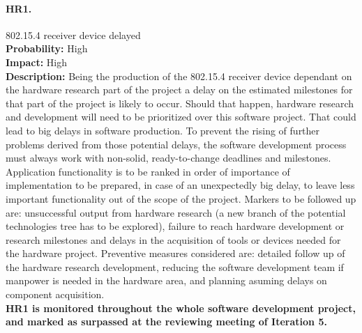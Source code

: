 		\paragraph{HR1.}802.15.4 receiver device delayed\\
		\textbf{Probability:} High\\
		\textbf{Impact:} High\\
		\textbf{Description:} Being the production of the 802.15.4 receiver device dependant on the hardware research part of the project a delay on the estimated milestones for that part of the project is likely to occur. Should that happen, hardware research and development will need to be prioritized over this software project. That could lead to big delays in software production.
		To prevent the rising of further problems derived from those potential delays, the software development process must always work with non-solid, ready-to-change deadlines and milestones. Application functionality is to be ranked in order of importance of implementation to be prepared, in case of an unexpectedly big delay, to leave less important functionality out of the scope of the project.
		Markers to be followed up are: unsuccessful output from hardware research (a new branch of the potential technologies tree has to be explored), failure to reach hardware development or research milestones and delays in the acquisition of tools or devices needed for the hardware project.
		Preventive measures considered are: detailed follow up of the hardware research development, reducing the software development team if manpower is needed in the hardware area, and planning asuming delays on component acquisition.\\
		\textbf{HR1 is monitored throughout the whole software development project, and marked as surpassed at the reviewing meeting of Iteration 5.}

